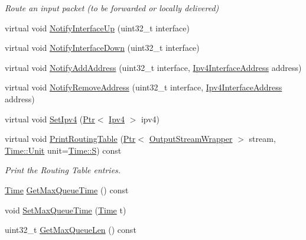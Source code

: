 \begin{DoxyCompactItemize}
\begin{DoxyCompactList}\small\item\em Route an input packet (to be forwarded or locally delivered) \end{DoxyCompactList}\item 
virtual void \hyperlink{classns3_1_1aodv_1_1RoutingProtocol_a006b7deb41f4eb2dc1e0d69d50c5a284}{Notify\+Interface\+Up} (uint32\+\_\+t interface)
\item 
virtual void \hyperlink{classns3_1_1aodv_1_1RoutingProtocol_a26b018550c9d7195f00bc73b266cc821}{Notify\+Interface\+Down} (uint32\+\_\+t interface)
\item 
virtual void \hyperlink{classns3_1_1aodv_1_1RoutingProtocol_a8d6ee1881856a557d8c051e40785e51b}{Notify\+Add\+Address} (uint32\+\_\+t interface, \hyperlink{classns3_1_1Ipv4InterfaceAddress}{Ipv4\+Interface\+Address} address)
\item 
virtual void \hyperlink{classns3_1_1aodv_1_1RoutingProtocol_aa3ada55a69e945cc414d87566cca0388}{Notify\+Remove\+Address} (uint32\+\_\+t interface, \hyperlink{classns3_1_1Ipv4InterfaceAddress}{Ipv4\+Interface\+Address} address)
\item 
virtual void \hyperlink{classns3_1_1aodv_1_1RoutingProtocol_a34df0b3e287abea45d48ab7c8162e183}{Set\+Ipv4} (\hyperlink{classns3_1_1Ptr}{Ptr}$<$ \hyperlink{classns3_1_1Ipv4}{Ipv4} $>$ ipv4)
\item 
virtual void \hyperlink{classns3_1_1aodv_1_1RoutingProtocol_a8c8226567e54cf4b98fa43349ed0725a}{Print\+Routing\+Table} (\hyperlink{classns3_1_1Ptr}{Ptr}$<$ \hyperlink{classns3_1_1OutputStreamWrapper}{Output\+Stream\+Wrapper} $>$ stream, \hyperlink{classns3_1_1Time_a87a7f4d29c68b047a72d291ad660295a}{Time\+::\+Unit} unit=\hyperlink{classns3_1_1Time_a87a7f4d29c68b047a72d291ad660295aade8622b06524a328cd3a59db6ccf76af}{Time\+::S}) const 
\begin{DoxyCompactList}\small\item\em Print the Routing Table entries. \end{DoxyCompactList}\item 
\hyperlink{classns3_1_1Time}{Time} \hyperlink{classns3_1_1aodv_1_1RoutingProtocol_acc957689cc3f248baaaf256b4f146a59}{Get\+Max\+Queue\+Time} () const 
\item 
void \hyperlink{classns3_1_1aodv_1_1RoutingProtocol_a6da1de88e09c9f1fa1983713b5fdbac7}{Set\+Max\+Queue\+Time} (\hyperlink{classns3_1_1Time}{Time} t)
\item 
uint32\+\_\+t \hyperlink{classns3_1_1aodv_1_1RoutingProtocol_a083d3102e6470b92f3027bc771a9b454}{Get\+Max\+Queue\+Len} () const 

\end{DoxyCompactItemize}
